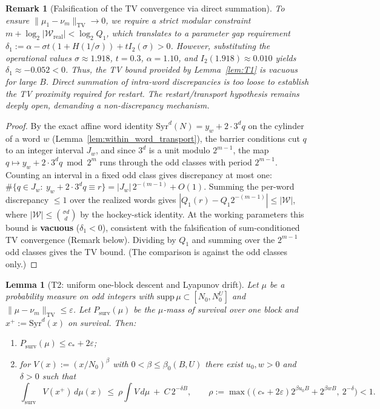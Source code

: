 \documentclass[12pt,a4paper]{article}
\newtheorem{lemma}[theorem]{Lemma}
\newtheorem{remark}[theorem]{Remark}
\begin{document}
\begin{remark}[Falsification of the TV convergence via direct summation]
To ensure $\|\mu_1-\nu_m\|_{\mathrm{TV}} \to 0$, we require a strict modular constraint $m + \log_2|\mathcal{W}_{\text{real}}| < \log_2 Q_1$, which translates to a parameter gap requirement $\delta_1 := \alpha - \sigma t(1 + H(1/\sigma)) + t I_2(\sigma) > 0$. However, substituting the operational values $\sigma \approx 1.918$, $t = 0.3$, $\alpha = 1.10$, and $I_2(1.918) \approx 0.010$ yields $\delta_1 \approx -0.052 < 0$. Thus, the TV bound provided by Lemma~\ref{lem:T1} is \emph{vacuous} for large $B$. Direct summation of intra-word discrepancies is too loose to establish the TV proximity required for restart. The restart/transport hypothesis remains deeply open, demanding a non-discrepancy mechanism.
\end{remark}

\begin{proof}
By the exact affine word identity
$\mathrm{Syr}^d(N)=y_w+2\cdot3^d q$ on the cylinder of a word $w$
(Lemma~\ref{lem:within_word_transport}), the barrier conditions cut $q$ to an
integer interval $J_w$, and since $3^d$ is a unit modulo $2^{m-1}$, the map
$q\mapsto y_w+2\cdot3^dq\bmod2^m$ runs through the odd classes with period
$2^{m-1}$. Counting an interval in a fixed odd class gives discrepancy at most
one:
$\#\{q\in J_w:\ y_w+2\cdot3^dq\equiv r\}=|J_w|\,2^{-(m-1)}+O(1)$.
Summing the per-word discrepancy $\le 1$ over the realized words gives $|Q_1(r) - Q_1 2^{-(m-1)}| \le |\mathcal{W}|$, where $|\mathcal{W}| \le \binom{\sigma d}{d}$ by the hockey-stick identity. At the working parameters this bound is \textbf{vacuous} ($\delta_1 < 0$), consistent with the falsification of sum-conditioned TV convergence (Remark below). Dividing by $Q_1$ and summing over the $2^{m-1}$ odd classes gives the
TV bound. (The comparison is against the odd classes only.)
\end{proof}

\begin{lemma}[T2: uniform one-block descent and Lyapunov drift]
\label{lem:T2}
Let $\mu$ be a probability measure on odd integers with
$\mathrm{supp}\,\mu\subset[N_0,N_0^{U}]$ and $\|\mu-\nu_m\|_{\mathrm{TV}}\le\varepsilon$.
Let $P_{\mathrm{surv}}(\mu)$ be the $\mu$-mass of survival over one block and
$x^+:=\mathrm{Syr}^d(x)$ on survival. Then:
\begin{enumerate}
\item[(i)] $P_{\mathrm{surv}}(\mu)\le c_*+2\varepsilon$;
\item[(ii)] for $V(x):=(x/N_0)^{\beta}$ with $0<\beta\le\beta_0(B,U)$ there exist
$u_0,w>0$ and $\delta>0$ such that
\[
\int_{\mathrm{surv}}V(x^+)\,d\mu(x)
\ \le\ \rho\int V\,d\mu\ +\ C\,2^{-\delta B},
\qquad
\rho:=\max\big((c_*+2\varepsilon)2^{\beta u_0B}+2^{\beta wB},\ 2^{-\delta}\big)<1 .
\]
\end{enumerate}
\end{lemma}
\end{document}
